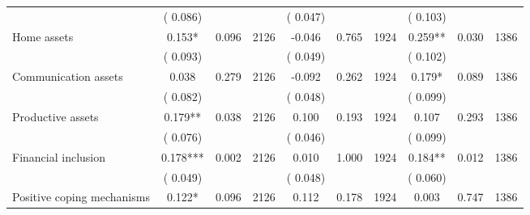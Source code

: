 \begin{tabular}{l*{9}{c}}
                               &        (       0.086) & &                                                                 &       (       0.047) & &                                                          &       (       0.103) & &  \\ 
 Home assets                 &              0.153*          &        0.096 & 2126          &             -0.046 &        0.765 & 1924                   &        0.259** &        0.030 & 1386                 \\ 
                               &        (       0.093) & &                                                                 &       (       0.049) & &                                                          &       (       0.102) & &  \\ 
 Communication assets                 &              0.038          &        0.279 & 2126          &             -0.092 &        0.262 & 1924                   &        0.179* &        0.089 & 1386                 \\ 
                               &        (       0.082) & &                                                                 &       (       0.048) & &                                                          &       (       0.099) & &   \\ 
 Productive assets                 &              0.179**          &        0.038 & 2126          &              0.100 &        0.193 & 1924                   &        0.107 &        0.293 & 1386                 \\ 
                               &        (       0.076) & &                                                                 &       (       0.046) & &                                                          &       (       0.099) & &   \\ 
 Financial inclusion                 &              0.178***          &        0.002 & 2126          &              0.010 &        1.000 & 1924                   &        0.184** &        0.012 & 1386                 \\ 
                               &        (       0.049) & &                                                                 &       (       0.048) & &                                                          &       (       0.060) & &  \\ 
 Positive coping mechanisms                &              0.122*        &        0.096 & 2126        &              0.112 &        0.178 & 1924               &        0.003 &        0.747 & 1386       \\ 

\end{tabular}
